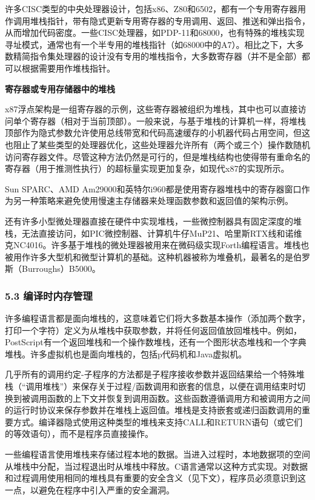 许多CISC类型的中央处理器设计，包括x86、Z80和6502，都有一个专用寄存器用作调用堆栈指针，带有隐式更新专用寄存器的专用调用、返回、推送和弹出指令，从而增加代码密度。一些CISC处理器，如PDP-11和68000，也有特殊的堆栈实现寻址模式，通常也有一个半专用的堆栈指针（如68000中的A7）。相比之下，大多数精简指令集处理器的设计没有专用的堆栈指令，大多数寄存器（并不是全部）都可以根据需要用作堆栈指针。

\textbf{寄存器或专用存储器中的堆栈}

x87浮点架构是一组寄存器的示例，这些寄存器被组织为堆栈，其中也可以直接访问单个寄存器（相对于当前顶部）。一般来说，与基于堆栈的计算机一样，将堆栈顶部作为隐式参数允许使用总线带宽和代码高速缓存的小机器代码占用空间，但这也阻止了某些类型的处理器优化，这些处理器允许所有（两个或三个）操作数随机访问寄存器文件。尽管这种方法仍然是可行的，但是堆栈结构也使得带有重命名的寄存器（用于推测性执行）的超标量实现更加复杂，如现代x87的实现所示。

Sun SPARC、AMD Am29000和英特尔i960都是使用寄存器堆栈中的寄存器窗口作为另一种策略来避免使用慢速主存储器来处理函数参数和返回值的架构示例。

还有许多小型微处理器直接在硬件中实现堆栈，一些微控制器具有固定深度的堆栈，无法直接访问，如PIC微控制器、计算机牛仔MuP21、哈里斯RTX线和诺维克NC4016。许多基于堆栈的微处理器被用来在微码级实现Forth编程语言。堆栈也被用作许多大型机和微型计算机的基础。这种机器被称为堆叠机，最著名的是伯罗斯（Burroughs）B5000。

\subsubsection{5.3 编译时内存管理}
许多编程语言都是面向堆栈的，这意味着它们将大多数基本操作（添加两个数字，打印一个字符）定义为从堆栈中获取参数，并将任何返回值放回堆栈中。例如，PostScript有一个返回堆栈和一个操作数堆栈，还有一个图形状态堆栈和一个字典堆栈。许多虚拟机也是面向堆栈的，包括p代码机和Java虚拟机。

几乎所有的调用约定-子程序的方法都是子程序接收参数并返回结果给一个特殊堆栈（“调用堆栈”）来保存关于过程/函数调用和嵌套的信息，以便在调用结束时切换到被调用函数的上下文并恢复到调用函数。这些函数遵循调用方和被调用方之间的运行时协议来保存参数并在堆栈上返回值。堆栈是支持嵌套或递归函数调用的重要方式。编译器隐式使用这种类型的堆栈来支持CALL和RETURN语句（或它们的等效语句），而不是程序员直接操作。

一些编程语言使用堆栈来存储过程本地的数据。当进入过程时，本地数据项的空间从堆栈中分配，当过程退出时从堆栈中释放。C语言通常以这种方式实现。对数据和过程调用使用相同的堆栈具有重要的安全含义（见下文），程序员必须意识到这一点，以避免在程序中引入严重的安全漏洞。
\be